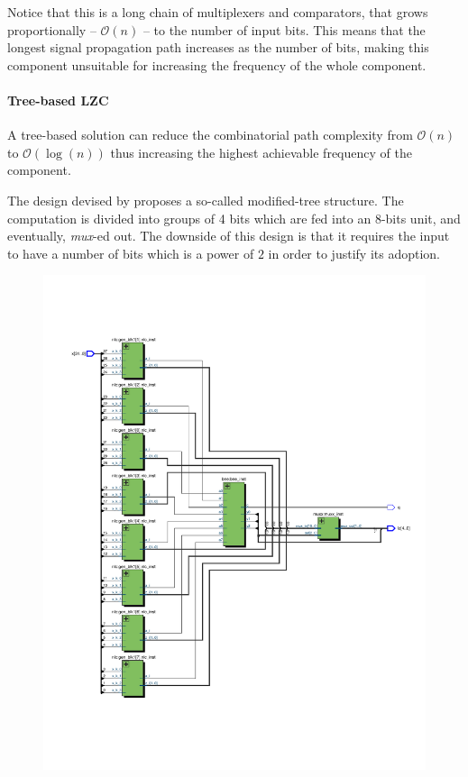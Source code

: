 Notice that this is a long chain of multiplexers and comparators, that grows proportionally -- $\mathcal{O}(n)$ -- to the number of input bits. This means that the longest signal propagation path increases as the number of bits, making this component unsuitable for increasing the frequency of the whole component.

\paragraph{Tree-based LZC}

A tree-based solution can reduce the combinatorial path complexity from $\mathcal{O}(n)$ to $\mathcal{O}(\log(n))$ thus increasing the highest achievable frequency of the component.


The design devised by \cite{milenkovic_modular_2015} proposes a so-called modified-tree structure. The computation is divided into groups of 4 bits which are fed into an 8-bits unit, and eventually, \textit{mux}-ed out.
The downside of this design is that it requires the input to have a number of bits which is a power of $2$ in order to justify its adoption.

\begin{figure}
        \centering
        \includegraphics[width=\textwidth]{figures/milenkovic_quartus1.pdf}
\end{figure}

